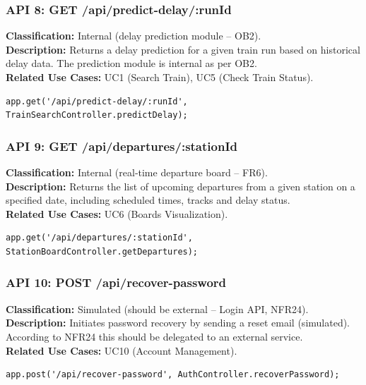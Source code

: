 \documentclass{article}
\begin{document}
\subsubsection*{API 8: GET /api/predict-delay/:runId}
\textbf{Classification:} Internal (delay prediction module – OB2).\\
\textbf{Description:} Returns a delay prediction for a given train run based on
historical delay data. The prediction module is internal as per OB2.\\
\textbf{Related Use Cases:} UC1 (Search Train), UC5 (Check Train Status).
\begin{verbatim}
app.get('/api/predict-delay/:runId', TrainSearchController.predictDelay);
\end{verbatim}

\subsubsection*{API 9: GET /api/departures/:stationId}
\textbf{Classification:} Internal (real‑time departure board – FR6).\\
\textbf{Description:} Returns the list of upcoming departures from a given station
on a specified date, including scheduled times, tracks and delay status.\\
\textbf{Related Use Cases:} UC6 (Boards Visualization).
\begin{verbatim}
app.get('/api/departures/:stationId', StationBoardController.getDepartures);
\end{verbatim}

\subsubsection*{API 10: POST /api/recover-password}
\textbf{Classification:} Simulated (should be external – Login API, NFR24).\\
\textbf{Description:} Initiates password recovery by sending a reset email
(simulated). According to NFR24 this should be delegated to an external service.\\
\textbf{Related Use Cases:} UC10 (Account Management).
\begin{verbatim}
app.post('/api/recover-password', AuthController.recoverPassword);
\end{verbatim}
\end{document}
